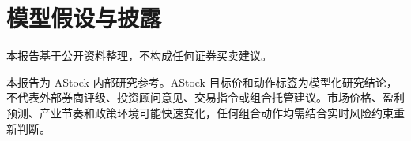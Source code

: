 \documentclass[a4paper,11pt,openany,fontset=none]{ctexrep}
\newcommand{\reportdisclaimer}{本报告基于公开资料整理，不构成任何证券买卖建议。}
\begin{document}
\chapter{模型假设与披露}


\clearpage
\thispagestyle{empty}
\vspace*{4cm}
\begin{disclosurebox}[免责声明]
\small
\reportdisclaimer\par
本报告为 AStock 内部研究参考。AStock 目标价和动作标签为模型化研究结论，不代表外部券商评级、投资顾问意见、交易指令或组合托管建议。市场价格、盈利预测、产业节奏和政策环境可能快速变化，任何组合动作均需结合实时风险约束重新判断。
\end{disclosurebox}
\end{document}
